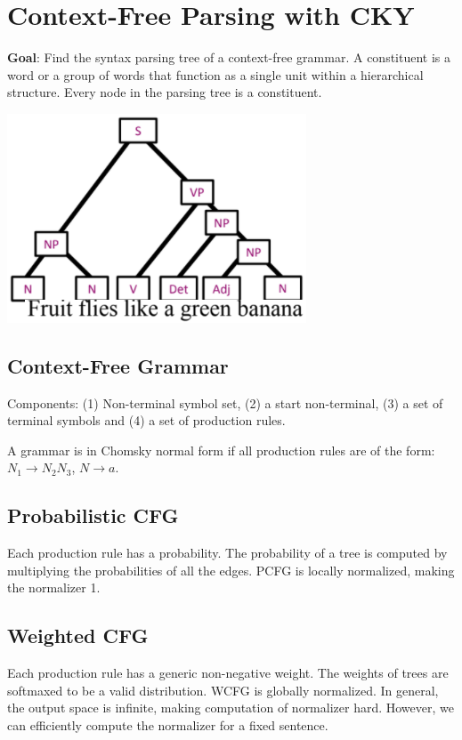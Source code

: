 \section{Context-Free Parsing with CKY}

\textbf{Goal}: Find the syntax parsing tree of a context-free grammar. A constituent is a word or a group of words that function as a single unit within a hierarchical structure. Every node in the parsing tree is a constituent.
\vspace{-0.4cm}
\begin{center}
    \includegraphics[width=.5\columnwidth]{img/syntex-tree.png}
\end{center}
\vspace{-0.4cm}
\subsection*{Context-Free Grammar}

Components: (1) Non-terminal symbol set, (2) a start non-terminal, (3) a set of terminal symbols and (4) a set of production rules.

A grammar is in Chomsky normal form if all production rules are of the form: $N_1\rightarrow N_2 N_3$, $N\rightarrow a$.

\subsection*{Probabilistic CFG}

Each production rule has a probability. The probability of a tree is computed by multiplying the probabilities of all the edges. PCFG is locally normalized, making the normalizer 1.

\subsection*{Weighted CFG}

Each production rule has a generic non-negative weight. The weights of trees are softmaxed to be a valid distribution. WCFG is globally normalized. In general, the output space is infinite, making computation of normalizer hard. However, we can efficiently compute the normalizer for a fixed sentence.

